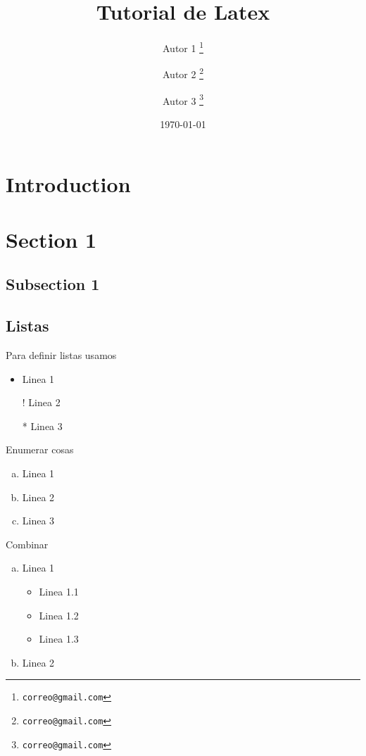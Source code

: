 \documentclass[12pt, letterpaper]{article}
\title{Tutorial de Latex}
\author[a]{Autor 1 \thanks{\texttt{correo@gmail.com}}}
\author[b]{Autor 2 \thanks{\texttt{correo@gmail.com}}}
\author[c]{Autor 3 \thanks{\texttt{correo@gmail.com}}}
\affil[a]{Universidad 1}
\affil[b]{Universidad 2}
\date{\today}
\begin{document}
\maketitle
\begin{abstract}
    \blindtext
\end{abstract}



\section{Introduction}
\blindtext
\section{Section 1}
\blindtext

\subsection{Subsection 1}
\blindtext

\subsection{Listas}

Para definir listas usamos

\begin{itemize}
    \item Linea 1
    \item[!] Linea 2
    \item[*] Linea 3
\end{itemize}

Enumerar cosas

\begin{enumerate}[a)]
    \item Linea 1
    \item Linea 2
    \item Linea 3
\end{enumerate}

Combinar

\begin{enumerate}[a.]
    \item Linea 1
    \begin{itemize}
        \item Linea 1.1
        \item Linea 1.2
        \item Linea 1.3
    \end{itemize}
    \item Linea 2
\end{enumerate}
\end{document}
